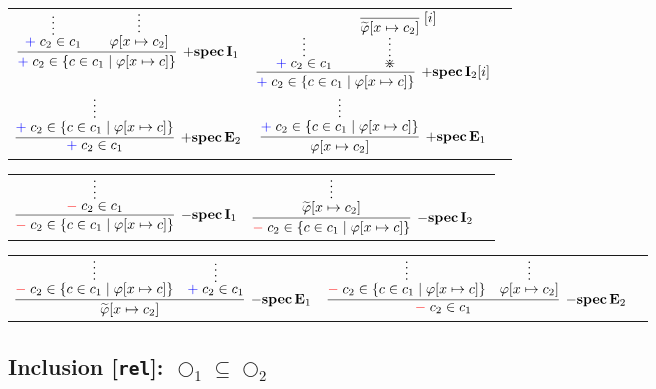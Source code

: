 \documentclass[11pt]{article}
\begin{document}
\noindent
\begin{tabular}{ccc}
$
\infer[\AssertRule{\Spec}\Intro{1}]{\Assert{c_2\in\SetB{c}{c_1}{\varphi}{x}}}{
	\infer*{\Assert{c_2\in c_1}}{}
	& &
	\infer*{\varphi[x\mapsto c_2]}{}
}
$
\hspace{1cm}
&
$
\infer[\AssertRule{\Spec}\Intro{2}{[i]}]{\Assert{c_2\in\SetB{c}{c_1}{\varphi}{x}}}{
	\infer*{\Assert{c_2\in c_1}}{}
	& &
	\infer*{\divideontimes}{\infer[\Label{i}]{\Opp{\varphi}[x\mapsto c_2]}{}}{}
}
$
\\[2mm]
$
\infer[\AssertRule{\Spec}\Elim{2}]{\Assert{c_2\in c_1}}{
	\infer*{\Assert{c_2\in\SetB{c}{c_1}{\varphi}{x}}}{}
}
$
\hspace{1cm}
&
$
\infer[\AssertRule{\Spec}\Elim{1}]{\varphi[x\mapsto c_2]}{
	\infer*{\Assert{c_2\in\SetB{c}{c_1}{\varphi}{x}}}{}
}
$
\end{tabular}
\bigskip

\noindent
\begin{tabular}{ccc}
$
\infer[\DenyRule{\Spec}\Intro{1}]{\Deny{c_2\in\SetB{c}{c_1}{\varphi}{x}}}{
	\infer*{\Deny{c_2\in c_1}}{}
}
$
\hspace{1cm}
&
$
\infer[\DenyRule{\Spec}\Intro{2}]{\Deny{c_2\in\SetB{c}{c_1}{\varphi}{x}}}{
	\infer*{\Opp{\varphi}[x\mapsto c_2]}{}
}
$
\end{tabular}
\bigskip


\noindent
\begin{tabular}{ccc}
$
\infer[\DenyRule{\Spec}\Elim{1}]{\Opp{\varphi}[x\mapsto c_2]}{
	\infer*{\Deny{c_2\in\SetB{c}{c_1}{\varphi}{x}}}{}
	& 
	\infer*{\Assert{c_2\in c_1}}{}
}
$
\hspace{5mm}
&
$
\infer[\DenyRule{\Spec}\Elim{2}]{\Deny{c_2\in c_1}}{
	\infer*{\Deny{c_2\in\SetB{c}{c_1}{\varphi}{x}}}{}
	& 
	\infer*{{\varphi}[x\mapsto c_2]}{}
}
$
\end{tabular}
\bigskip


\newpage
\subsection*{Inclusion [\texttt{rel}]: $\bigcirc_1\subseteq\bigcirc_2$}
\smallskip
\end{document}
